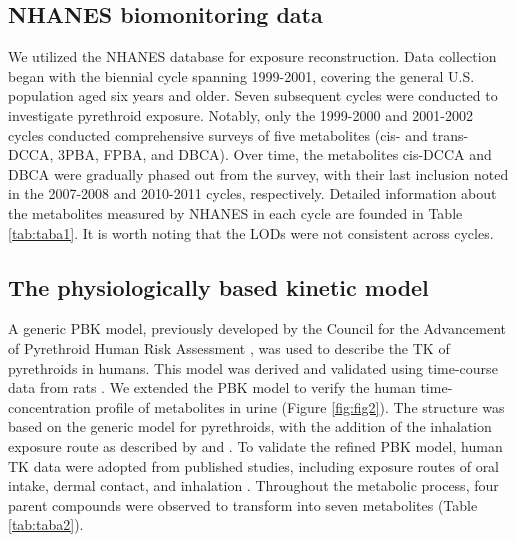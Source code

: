 \documentclass[toxics,article,submit,pdftex,moreauthors]{Definitions/mdpi}
\begin{document}
\subsection{NHANES biomonitoring data}\label{nhanes-biomonitoring-data}

We utilized the NHANES database for exposure reconstruction. Data
collection began with the biennial cycle spanning 1999-2001, covering
the general U.S. population aged six years and older. Seven subsequent
cycles were conducted to investigate pyrethroid exposure. Notably, only
the 1999-2000 and 2001-2002 cycles conducted comprehensive surveys of
five metabolites (cis- and trans-DCCA, 3PBA, FPBA, and DBCA). Over time,
the metabolites cis-DCCA and DBCA were gradually phased out from the
survey, with their last inclusion noted in the 2007-2008 and 2010-2011
cycles, respectively. Detailed information about the metabolites
measured by NHANES in each cycle are founded in Table \ref{tab:taba1}.
It is worth noting that the LODs were not consistent across cycles.

\subsection{The physiologically based kinetic
model}\label{the-physiologically-based-kinetic-model}

A generic PBK model, previously developed by the Council for the
Advancement of Pyrethroid Human Risk Assessment
\citep{song2019evaluation, mallick2020development, mallick_physiologically_2020},
was used to describe the TK of pyrethroids in humans. This model was
derived and validated using time-course data from rats
\citep{mirfazaelian_development_2006, tornero2010evaluation}. We
extended the PBK model to verify the human time-concentration profile of
metabolites in urine (Figure \ref{fig:fig2}). The structure was based on
the generic model for pyrethroids, with the addition of the inhalation
exposure route as described by \citet{beaudouin2010stochastic} and
\citet{quindroit2019estimating}. To validate the refined PBK model,
human TK data were adopted from published studies, including exposure
routes of oral intake, dermal contact, and inhalation
\citep{leng1997human, leng1997biological, ratelle2015toxicokinetics, ratelle2015time}.
Throughout the metabolic process, four parent compounds were observed to
transform into seven metabolites (Table \ref{tab:taba2}).
\end{document}
